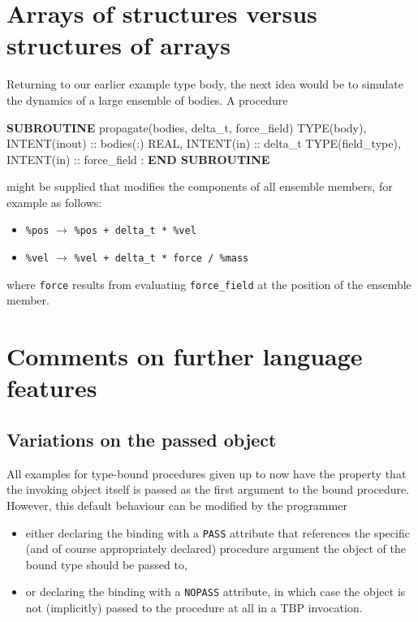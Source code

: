 \documentclass[
  paper=a4,
  ,captions=tableheading
]{scrartcl}
\newenvironment{Shaded}{\begin{snugshade}}{\end{snugshade}}
\newcommand{\DataTypeTok}[1]{\textcolor[rgb]{0.13,0.29,0.53}{#1}}
\newcommand{\KeywordTok}[1]{\textcolor[rgb]{0.13,0.29,0.53}{\textbf{#1}}}
\newcommand{\NormalTok}[1]{#1}
\providecommand{\tightlist}{%
  \setlength{\itemsep}{0pt}\setlength{\parskip}{0pt}}
\begin{document}
\section{Arrays of structures versus structures of
arrays}\label{arrays-of-structures-versus-structures-of-arrays}

Returning to our earlier example type body, the next idea would be to
simulate the dynamics of a large ensemble of bodies. A procedure

\begin{Shaded}
\begin{Highlighting}[]
\KeywordTok{SUBROUTINE}\NormalTok{ propagate(bodies, delta\_t, force\_field)}
   \DataTypeTok{TYPE(body)}\NormalTok{, }\DataTypeTok{INTENT(inout)} \DataTypeTok{::}\NormalTok{ bodies(:)}
   \DataTypeTok{REAL}\NormalTok{, }\DataTypeTok{INTENT(in)} \DataTypeTok{::}\NormalTok{ delta\_t}
   \DataTypeTok{TYPE(field\_type)}\NormalTok{, }\DataTypeTok{INTENT(in)} \DataTypeTok{::}\NormalTok{ force\_field}
\NormalTok{   :}
\KeywordTok{END SUBROUTINE}
\end{Highlighting}
\end{Shaded}

might be supplied that modifies the components of all ensemble members,
for example as follows:

\begin{itemize}
\tightlist
\item
  \texttt{\%pos} \(\longrightarrow\)
  \texttt{\%pos\ +\ delta\_t\ *\ \%vel}
\item
  \texttt{\%vel} \(\longrightarrow\)
  \texttt{\%vel\ +\ delta\_t\ *\ force\ /\ \%mass}
\end{itemize}

where \texttt{force} results from evaluating \texttt{force\_field} at
the position of the ensemble member.

\section{Comments on further language
features}\label{comments-on-further-language-features}

\subsection{Variations on the passed
object}\label{variations-on-the-passed-object}

All examples for type-bound procedures given up to now have the property
that the invoking object itself is passed as the first argument to the
bound procedure. However, this default behaviour can be modified by the
programmer

\begin{itemize}
\tightlist
\item
  either declaring the binding with a \texttt{PASS} attribute that
  references the specific (and of course appropriately declared)
  procedure argument the object of the bound type should be passed to,
\item
  or declaring the binding with a \texttt{NOPASS} attribute, in which
  case the object is not (implicitly) passed to the procedure at all in
  a TBP invocation.
\end{itemize}
\end{document}
